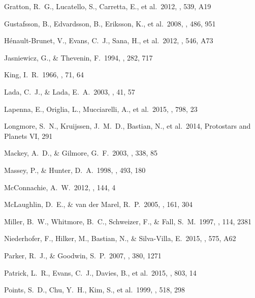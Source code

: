 \documentclass[useAMS,usenatbib]{mn2e}
\begin{document}
\begin{thebibliography}{99}
 Gratton, R.~G., Lucatello, S., Carretta, E., et al.\ 2012, \aap, 539, A19

 Gustafsson, B., Edvardsson, B., Eriksson, K., et al.\ 2008, \aap, 486, 951

 H{\'e}nault-Brunet, V., Evans, C.~J., Sana, H., et al.\ 2012, \aap, 546, A73

 Jasniewicz, G., \& Thevenin, F.\ 1994, \aap, 282, 717

 King, I.~R.\ 1966, \aj, 71, 64

 Lada, C.~J., \& Lada, E.~A.\ 2003, \araa, 41, 57

 Lapenna, E., Origlia,
L., Mucciarelli, A., et al.\ 2015, \apj, 798, 23

 Longmore, S.~N.,
Kruijssen, J.~M.~D., Bastian, N., et al.\ 2014, Protostars and Planets VI, 291

 Mackey, A.~D., \& Gilmore, G.~F.\ 2003, \mnras, 338, 85

 Massey, P., \& Hunter, D.~A.\ 1998, \apj, 493, 180

 McConnachie, A.~W.\ 2012,
\aj, 144, 4

 McLaughlin, D.~E., \& van der Marel, R.~P.\ 2005, \apjs, 161, 304

 Miller, B.~W., Whitmore,
B.~C., Schweizer, F., \& Fall, S.~M.\ 1997, \aj, 114, 2381

 Niederhofer, F., Hilker, M., Bastian, N., \& Silva-Villa, E.\ 2015, \aap, 575, A62

 Parker, R.~J., \& Goodwin, S.~P.\ 2007, \mnras, 380, 1271

 Patrick, L.~R., Evans,
C.~J., Davies, B., et al.\ 2015, \apj, 803, 14

 Points, S.~D., Chu,
Y.~H., Kim, S., et al.\ 1999, \apj, 518, 298


\end{thebibliography}
\end{document}
